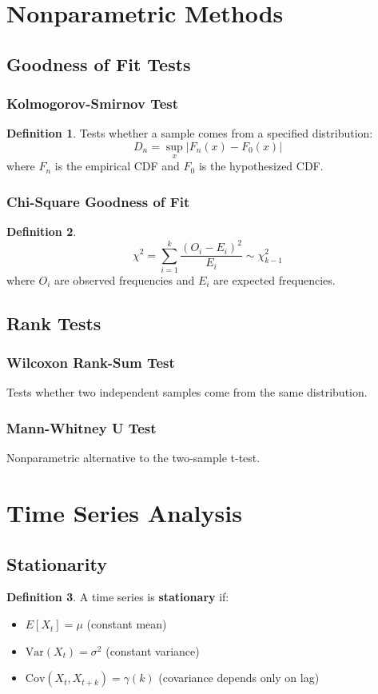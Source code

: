 \documentclass[11pt]{article}
\theoremstyle{definition}
\newtheorem{definition}{Definition}[section]
\begin{document}
\section{Nonparametric Methods}

\subsection{Goodness of Fit Tests}

\subsubsection{Kolmogorov-Smirnov Test}
\begin{definition}
Tests whether a sample comes from a specified distribution:
$$D_n = \sup_x |F_n(x) - F_0(x)|$$
where $F_n$ is the empirical CDF and $F_0$ is the hypothesized CDF.
\end{definition}

\subsubsection{Chi-Square Goodness of Fit}
\begin{definition}
$$\chi^2 = \sum_{i=1}^k \frac{(O_i - E_i)^2}{E_i} \sim \chi^2_{k-1}$$
where $O_i$ are observed frequencies and $E_i$ are expected frequencies.
\end{definition}

\subsection{Rank Tests}

\subsubsection{Wilcoxon Rank-Sum Test}
Tests whether two independent samples come from the same distribution.

\subsubsection{Mann-Whitney U Test}
Nonparametric alternative to the two-sample t-test.

\section{Time Series Analysis}

\subsection{Stationarity}
\begin{definition}
A time series is \textbf{stationary} if:
\begin{itemize}
    \item $E[X_t] = \mu$ (constant mean)
    \item $\text{Var}(X_t) = \sigma^2$ (constant variance)
    \item $\text{Cov}(X_t, X_{t+k}) = \gamma(k)$ (covariance depends only on lag)
\end{itemize}
\end{definition}
\end{document}
